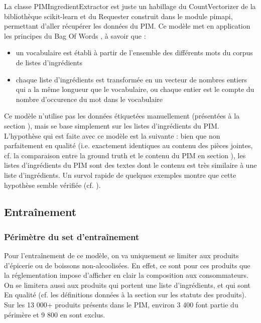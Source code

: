            La classe PIMIngredientExtractor est juste un habillage du CountVectorizer de la bibliothèque scikit-learn et du Requester construit dans le module pimapi, permettant d'aller récupérer les données du PIM.
            Ce modèle met en application les principes du \og Bag Of Words \fg \cite{bag_of_words_wiki}, à savoir que :
            \begin{itemize}
                \item un vocabulaire est établi à partir de l'ensemble des différents mots du corpus de listes d'ingrédients
                \item chaque liste d'ingrédients est transformée en un vecteur de nombres entiers qui a la même longueur que le vocabulaire, ou chaque entier est le compte du nombre d'occurence du mot dans le vocabulaire
            \end{itemize}

            Ce modèle n'utilise pas les données étiquetées manuellement (présentées à la section ), mais se base simplement sur les listes d'ingrédients du PIM.
            L'hypothèse qui est faite avec ce modèle est la suivante : bien que non parfaitement en qualité (i.e. exactement identiques au contenu des pièces jointes, cf. la comparaison entre la ground truth et le contenu du PIM en section ), les listes d'ingrédients du PIM sont des textes dont le contenu est très similaire à une liste d'ingrédients.
            Un survol rapide de quelques exemples montre que cette hypothèse semble vérifiée (cf. ).

        \subsection{Entraînement}

            \subsubsection{Périmètre du set d'entraînement}
            
            Pour l'entraînement de ce modèle, on va uniquement se limiter aux produits d'épicerie ou de boissons non-alcoolisées.
            En effet, ce sont pour ces produits que la réglementation impose d'afficher en clair la composition aux consommateurs.
            On se limitera aussi aux produits qui portent une liste d'ingrédients, et qui sont \og En qualité \fg (cf. les définitions données à la section  sur les statuts des produits).
            Sur les 13 000+ produits présents dans le PIM, environ 3 400 font partie du périmère et 9 800 en sont exclus.

